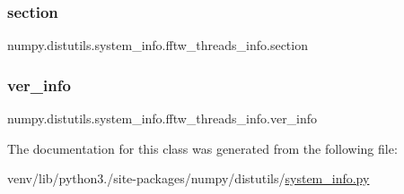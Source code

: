 \subsubsection{\texorpdfstring{section}{section}}
{\footnotesize\ttfamily numpy.\+distutils.\+system\+\_\+info.\+fftw\+\_\+threads\+\_\+info.\+section\hspace{0.3cm}{\ttfamily [static]}}

\mbox{\label{classnumpy_1_1distutils_1_1system__info_1_1fftw__threads__info_a5706af9ca7174e986ac95bfa0d5065eb}} 
\subsubsection{\texorpdfstring{ver\+\_\+info}{ver\_info}}
{\footnotesize\ttfamily numpy.\+distutils.\+system\+\_\+info.\+fftw\+\_\+threads\+\_\+info.\+ver\+\_\+info\hspace{0.3cm}{\ttfamily [static]}}



The documentation for this class was generated from the following file\+:\begin{DoxyCompactItemize}
\item 
venv/lib/python3./site-\/packages/numpy/distutils/\hyperlink{system__info_8py}{system\+\_\+info.\+py}\end{DoxyCompactItemize}
